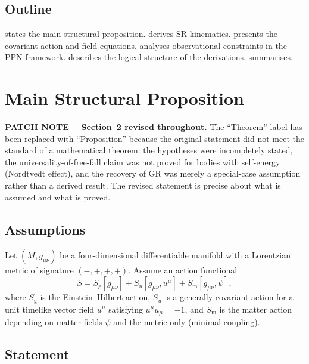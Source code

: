 \documentclass[12pt,a4paper]{article}
\newcommand{\patchnote}[1]{%
  \begin{patchbox}
    {\small\color{patchtext}\textbf{PATCH NOTE\,---\,}#1}
  \end{patchbox}}
\newcommand{\EH}{S_{\mathrm{g}}}
\newcommand{\Su}{S_{u}}
\newcommand{\Sm}{S_{\mathrm{m}}}
\begin{document}
\subsection{Outline}

 states the main structural proposition.
 derives SR kinematics.
 presents the covariant action and field equations.
 analyses observational constraints in the PPN framework.
 describes the logical structure of the derivations.
 summarises.

\section{Main Structural Proposition}
\label{sec:proposition}

\patchnote{\textbf{Section~2 revised throughout.}
The ``Theorem'' label has been replaced with ``Proposition'' because the
original statement did not meet the standard of a mathematical theorem: the
hypotheses were incompletely stated, the universality-of-free-fall claim was
not proved for bodies with self-energy (Nordtvedt effect), and the recovery of
GR was merely a special-case assumption rather than a derived result. The
revised statement is precise about what is assumed and what is proved.}

\subsection{Assumptions}

Let $(M,g_{\mu\nu})$ be a four-dimensional differentiable manifold with a
Lorentzian metric of signature $(-,+,+,+)$. Assume an action functional
\begin{equation}
  S = \EH[g_{\mu\nu}]+\Su[g_{\mu\nu},u^{\mu}]+\Sm[g_{\mu\nu},\psi],
  \label{eq:total_action}
\end{equation}
where $\EH$ is the Einstein--Hilbert action, $\Su$ is a generally covariant
action for a unit timelike vector field $u^{\mu}$ satisfying
$u^{\mu}u_{\mu}=-1$, and $\Sm$ is the matter action depending on matter
fields $\psi$ and the metric only (minimal coupling).

\subsection{Statement}
\end{document}
